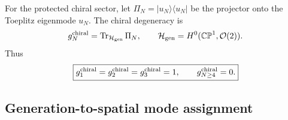 \documentclass[aps,prd,preprint,notitlepage,nofootinbib,superscriptaddress,floatfix]{revtex4-2}
\newcommand{\Tr}{\operatorname{Tr}}
\newcommand{\cH}{\mathcal H}
\newcommand{\cO}{\mathcal O}
\newcommand{\CP}{\mathbb{CP}}
\theoremstyle{remark}
\begin{document}
For the protected chiral sector, let \(\Pi_N=|u_N\rangle\langle u_N|\) be the projector onto the Toeplitz eigenmode \(u_N\).
The chiral degeneracy is
\begin{equation}
g_N^{\rm chiral}
=
\Tr_{\cH_{\rm gen}}\Pi_N,
\qquad
\cH_{\rm gen}=H^0(\CP^1,\cO(2)).
\end{equation}
Thus
\begin{equation}
\boxed{
g_1^{\rm chiral}=g_2^{\rm chiral}=g_3^{\rm chiral}=1,
\qquad
g_{N\ge4}^{\rm chiral}=0.
}
\label{eq:gN}
\end{equation}

\subsection{Generation-to-spatial mode assignment}
\label{sec:mode_locking}
\end{document}

